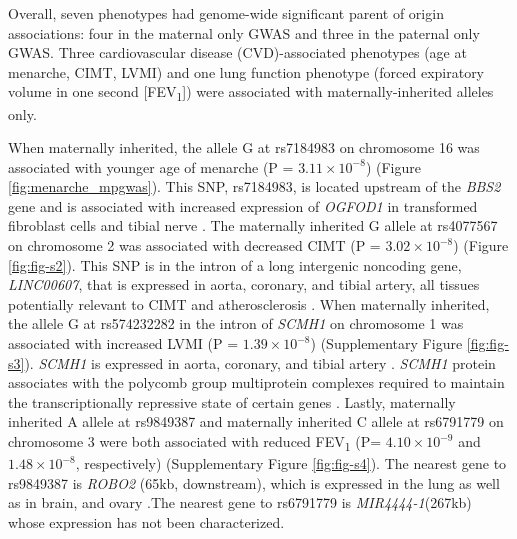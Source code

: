 Overall, seven phenotypes had genome-wide significant parent of origin associations: four in the maternal only GWAS and three in the paternal only GWAS. Three cardiovascular disease (CVD)-associated phenotypes (age at menarche, CIMT, LVMI) and one lung function phenotype (forced expiratory volume in one second [FEV\textsubscript{1}]) were associated with maternally-inherited alleles only. 

When maternally inherited, the allele G at rs7184983 on chromosome 16 was associated with younger age of menarche (P = $ 3.11 \times 10^{-8}$) (Figure \ref{fig:menarche_mpgwas}). This SNP, rs7184983, is located upstream of the \emph{BBS2} gene and is associated with increased expression of \emph{OGFOD1} in transformed fibroblast cells and tibial nerve \cite{Consortium2015}. The maternally inherited G allele at rs4077567 on chromosome 2 was associated with decreased CIMT (P = $ 3.02 \times 10^{-8}$) (Figure \ref{fig:fig-s2}). This SNP is in the intron of a long intergenic noncoding gene, \emph{LINC00607}, that  is expressed in aorta, coronary, and tibial artery, all tissues potentially relevant to CIMT and atherosclerosis \cite{Consortium2015}. When maternally inherited, the allele G at rs574232282  in the intron of \emph{SCMH1} on chromosome 1 was associated with increased LVMI (P = $ 1.39 \times 10^{-8}$) (Supplementary Figure \ref{fig:fig-s3}). \emph{SCMH1} is expressed in aorta, coronary, and tibial artery \cite{Consortium2015}. \emph{SCMH1} protein associates with the polycomb group multiprotein complexes required to maintain the transcriptionally repressive state of certain genes \cite{Consortium2015}. Lastly, maternally inherited A allele at rs9849387 and maternally inherited C allele at rs6791779 on chromosome 3 were both associated with reduced FEV\textsubscript{1} (P= $ 4.10 \times 10^{-9}$ and $1.48 \times 10^{-8}$, respectively) (Supplementary Figure \ref{fig:fig-s4}). The nearest gene to rs9849387 is \emph{ROBO2} (65kb, downstream), which is expressed in the lung as well as in brain, and ovary \cite{Consortium2015}.The nearest gene to rs6791779 is \emph{MIR4444-1}(267kb) whose expression has not been characterized.

